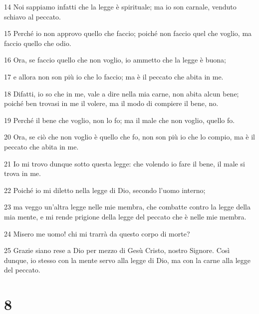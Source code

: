 \par 14 Noi sappiamo infatti che la legge è spirituale; ma io son carnale, venduto schiavo al peccato.
\par 15 Perché io non approvo quello che faccio; poiché non faccio quel che voglio, ma faccio quello che odio.
\par 16 Ora, se faccio quello che non voglio, io ammetto che la legge è buona;
\par 17 e allora non son più io che lo faccio; ma è il peccato che abita in me.
\par 18 Difatti, io so che in me, vale a dire nella mia carne, non abita alcun bene; poiché ben trovasi in me il volere, ma il modo di compiere il bene, no.
\par 19 Perché il bene che voglio, non lo fo; ma il male che non voglio, quello fo.
\par 20 Ora, se ciò che non voglio è quello che fo, non son più io che lo compio, ma è il peccato che abita in me.
\par 21 Io mi trovo dunque sotto questa legge: che volendo io fare il bene, il male si trova in me.
\par 22 Poiché io mi diletto nella legge di Dio, secondo l'uomo interno;
\par 23 ma veggo un'altra legge nelle mie membra, che combatte contro la legge della mia mente, e mi rende prigione della legge del peccato che è nelle mie membra.
\par 24 Misero me uomo! chi mi trarrà da questo corpo di morte?
\par 25 Grazie siano rese a Dio per mezzo di Gesù Cristo, nostro Signore. Così dunque, io stesso con la mente servo alla legge di Dio, ma con la carne alla legge del peccato.

\chapter{8}

